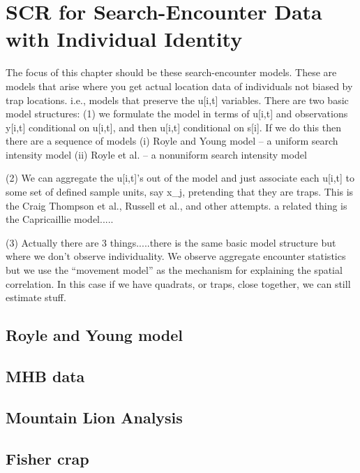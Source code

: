 \chapter{SCR for Search-Encounter Data with Individual Identity}
\label{chapt.searchencounter}

\vspace{0.3cm}


The focus of this chapter should be these search-encounter models. These are
models that arise where you get actual location data of individuals not
biased by trap locations. i.e., models that preserve the u[i,t] variables.
There are two basic model structures:
 (1) we formulate the model in terms of u[i,t] and observations y[i,t]
 conditional on u[i,t], and then u[i,t] conditional on s[i].
  If we do this then there are a sequence of models 
   (i) Royle and Young model -- a uniform search intensity model
  (ii) Royle et al. -- a nonuniform search intensity model
  
 (2) We can aggregate the u[i,t]'s out of the model and just associate
 each u[i,t] to some set of defined sample units, say x_{j}, pretending
 that they are traps. This is the Craig Thompson et al.,  Russell et al., 
 and other attempts.  a related thing is the Capricaillie model.....
 
 (3) Actually there are 3 things.....there is the same basic model structure
 but where we don't observe individuality. We observe aggregate encounter
 statistics but we use the ``movement model'' as the mechanism for explaining
 the spatial correlation.  In this case if we have quadrats, or traps,
 close together, we can still estimate stuff. 


\section{Royle and Young model}

\section{MHB data}

\section{Mountain Lion Analysis}

\section{Fisher crap}

